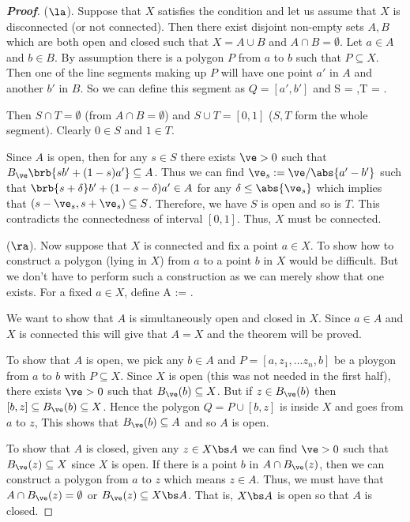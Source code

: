 \begin{proof}[\bf Proof]
($\la$). Suppose that $X$ satisfies the condition and let us assume that $X$ is disconnected (or not connected). Then there exist disjoint non-empty sets $A,B$ which are both open and closed such that $X = A\cup B$ and $A\cap B = \emptyset$. Let $a\in A$ and $b\in B$. By assumption there is a polygon $P$ from $a$ to $b$ such that $P \subseteq X$. Then one of the line segments making up $P$ will have one point $a'$ in $A$ and another $b'$ in $B$. So we can define this segment as $Q = [a',b']$ and
\be
S = ,\qquad T = .
\ee

Then $S\cap T = \emptyset$ (from $A\cap B = \emptyset$) and $S\cup T = [0,1]$ ($S,T$ form the whole segment). Clearly $0\in S$ and $1\in T$.


Since $A$ is open, then for any $s\in S$ there exists $\ve>0$ such that $B_\ve\brb{sb'+ (1-s)a'}\subseteq A$. Thus we can find $\ve_s := \ve/\abs{a'-b'}$ such that $\brb{s+\delta} b'+ (1-s-\delta)a' \in A$ for any $\delta \leq \abs{\ve_s}$ which implies that $(s-\ve_s,s + \ve_s) \subseteq S$. Therefore, we have $S$ is open and so is $T$. This contradicts the connectedness of interval $[0,1]$. Thus, $X$ must be connected.

($\ra$). Now suppose that $X$ is connected and fix a point $a\in X$. To show how to construct a polygon (lying in $X$) from $a$ to a point $b$ in $X$ would be difficult. But we don't have to perform such a construction as we can merely show that one exists. For a fixed $a\in X$, define
\be
A := .
\ee

We want to show that $A$ is simultaneously open and closed in $X$. Since $a\in A$ and $X$ is connected this will give that $A=X$ and the theorem will be proved.

To show that $A$ is open, we pick any $b\in A$ and $P = [a,z_1,\dots z_n,b]$ be a ploygon from $a$ to $b$ with $P\subseteq X$. Since $X$ is open (this was not needed in the first half), there exists $\ve>0$ such that $B_\ve(b)\subseteq X$. But if $z\in B_\ve(b)$ then $[b,z] \subseteq B_\ve(b) \subseteq X$. Hence the polygon $Q = P\cup [b,z]$ is inside $X$ and goes from $a$ to $z$, This shows that $B_\ve(b) \subseteq A$ and so $A$ is open.

To show that $A$ is closed, given any $z\in X\bs A$ we can find $\ve>0$ such that $B_\ve(z)\subseteq X$ since $X$ is open. If there is a point $b$ in $A\cap B_\ve(z)$, then we can construct a polygon from $a$ to $z$ which means $z\in A$. Thus, we must have that $A\cap B_\ve(z) = \emptyset$ or $B_\ve(z) \subseteq X\bs A$. That is, $X\bs A$ is open so that $A$ is closed.
\end{proof}





